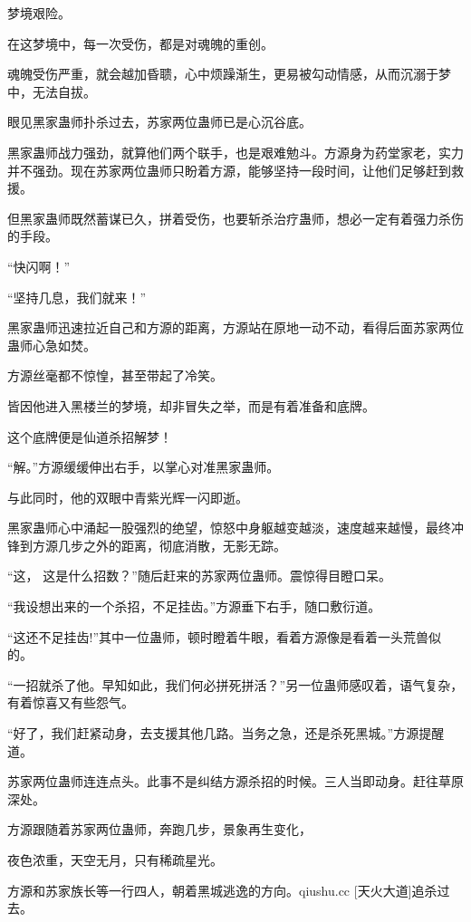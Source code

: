 
\begin{this_body}

梦境艰险。

在这梦境中，每一次受伤，都是对魂魄的重创。

魂魄受伤严重，就会越加昏聩，心中烦躁渐生，更易被勾动情感，从而沉溺于梦中，无法自拔。

眼见黑家蛊师扑杀过去，苏家两位蛊师已是心沉谷底。

黑家蛊师战力强劲，就算他们两个联手，也是艰难勉斗。方源身为药堂家老，实力并不强劲。现在苏家两位蛊师只盼着方源，能够坚持一段时间，让他们足够赶到救援。

但黑家蛊师既然蓄谋已久，拼着受伤，也要斩杀治疗蛊师，想必一定有着强力杀伤的手段。

“快闪啊！”

“坚持几息，我们就来！”

黑家蛊师迅速拉近自己和方源的距离，方源站在原地一动不动，看得后面苏家两位蛊师心急如焚。

方源丝毫都不惊惶，甚至带起了冷笑。

皆因他进入黑楼兰的梦境，却非冒失之举，而是有着准备和底牌。

这个底牌便是仙道杀招解梦！

“解。”方源缓缓伸出右手，以掌心对准黑家蛊师。

与此同时，他的双眼中青紫光辉一闪即逝。

黑家蛊师心中涌起一股强烈的绝望，惊怒中身躯越变越淡，速度越来越慢，最终冲锋到方源几步之外的距离，彻底消散，无影无踪。

“这， 这是什么招数？”随后赶来的苏家两位蛊师。震惊得目瞪口呆。

“我设想出来的一个杀招，不足挂齿。”方源垂下右手，随口敷衍道。

“这还不足挂齿!”其中一位蛊师，顿时瞪着牛眼，看着方源像是看着一头荒兽似的。

“一招就杀了他。早知如此，我们何必拼死拼活？”另一位蛊师感叹着，语气复杂，有着惊喜又有些怨气。

“好了，我们赶紧动身，去支援其他几路。当务之急，还是杀死黑城。”方源提醒道。

苏家两位蛊师连连点头。此事不是纠结方源杀招的时候。三人当即动身。赶往草原深处。

方源跟随着苏家两位蛊师，奔跑几步，景象再生变化，

夜色浓重，天空无月，只有稀疏星光。

方源和苏家族长等一行四人，朝着黑城逃逸的方向。qiushu.cc [天火大道]追杀过去。


\end{this_body}

